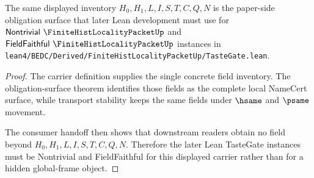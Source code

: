 \begin{theorem}
\label{thm:finite-hist-locality-packet-tastegate-handoff}
The same displayed inventory $H_0,H_1,L,I,S,T,C,Q,N$ is the paper-side obligation surface that later Lean development must use for $\mathsf{Nontrivial}\ \FiniteHistLocalityPacketUp$ and $\mathsf{FieldFaithful}\ \FiniteHistLocalityPacketUp$ instances in \texttt{lean4/BEDC/Derived/FiniteHistLocalityPacketUp/TasteGate.lean}.
\end{theorem}
\begin{proof}
The carrier definition supplies the single concrete field inventory. The obligation-surface theorem identifies those fields as the complete local NameCert surface, while transport stability keeps the same fields under $\hsame$ and $\psame$ movement.

The consumer handoff then shows that downstream readers obtain no field beyond $H_0,H_1,L,I,S,T,C,Q,N$. Therefore the later Lean TasteGate instances must be Nontrivial and FieldFaithful for this displayed carrier rather than for a hidden global-frame object.
\end{proof}

